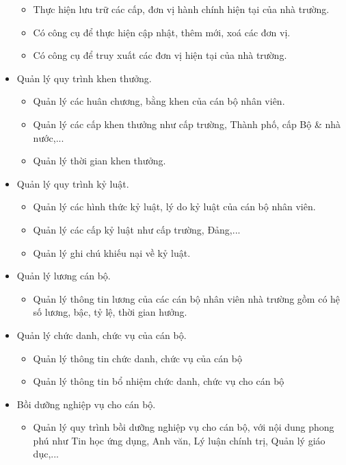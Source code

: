 \begin{itemize}
    \begin{itemize}
        \item Thực hiện lưu trữ các cấp, đơn vị hành chính hiện tại của nhà trường.
        \item Có công cụ để thực hiện cập nhật, thêm mới, xoá các đơn vị.
        \item Có công cụ để truy xuất các đơn vị hiện tại của nhà trường.
    \end{itemize}
    \item Quản lý quy trình khen thưởng.
    \begin{itemize}
        \item Quản lý các huân chương, bằng khen của cán bộ nhân viên.
        \item Quản lý các cấp khen thưởng như cấp trường, Thành phố, cấp Bộ \& nhà nước,...
        \item Quản lý thời gian khen thưởng.
    \end{itemize}
    \item Quản lý quy trình kỷ luật.
    \begin{itemize}
        \item Quản lý các hình thức kỷ luật, lý do kỷ luật của cán bộ nhân viên.
        \item Quản lý các cấp kỷ luật như cấp trường, Đảng,...
        \item Quản lý ghi chú khiếu nại về kỷ luật.
    \end{itemize}
    \item Quản lý lương cán bộ.
    \begin{itemize}
        \item Quản lý thông tin lương của các cán bộ nhân viên nhà trường gồm có hệ số lương, bậc, tỷ lệ, thời gian hưởng.
    \end{itemize}
    \item Quản lý chức danh, chức vụ của cán bộ.
    \begin{itemize}
        \item Quản lý thông tin chức danh, chức vụ của cán bộ
        \item Quản lý thông tin bổ nhiệm chức danh, chức vụ cho cán bộ
    \end{itemize}
    \item Bồi dưỡng nghiệp vụ cho cán bộ.
    \begin{itemize}
        \item Quản lý quy trình bồi dưỡng nghiệp vụ cho cán bộ, với nội dung phong phú như Tin học ứng dụng, Anh văn, Lý luận chính trị, Quản lý giáo dục,...

\end{itemize}
\end{itemize}
